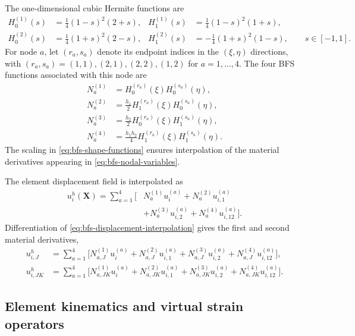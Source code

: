 \documentclass[preprint,12pt]{elsarticle}
\begin{document}
The one-dimensional cubic Hermite functions are
\begin{align}
 H_0^{(1)}(s)&=\frac{1}{4}(1-s)^2(2+s),
 & H_1^{(1)}(s)&=\frac{1}{4}(1-s)^2(1+s),
 \nonumber\\
 H_0^{(2)}(s)&=\frac{1}{4}(1+s)^2(2-s),
 & H_1^{(2)}(s)&=-\frac{1}{4}(1+s)^2(1-s),
 \qquad s\in[-1,1].
 \label{eq:hermite-functions}
\end{align}
For node $a$, let $(r_a,s_a)$ denote its endpoint indices in the
$(\xi,\eta)$ directions, with
$(r_a,s_a)=(1,1),(2,1),(2,2),(1,2)$ for $a=1,\ldots,4$. The four BFS
functions associated with this node are
\begin{align}
 N_a^{(1)}&=H_0^{(r_a)}(\xi)H_0^{(s_a)}(\eta),
 \nonumber\\
 N_a^{(2)}&=\frac{h_1}{2}H_1^{(r_a)}(\xi)H_0^{(s_a)}(\eta),
 \nonumber\\
 N_a^{(3)}&=\frac{h_2}{2}H_0^{(r_a)}(\xi)H_1^{(s_a)}(\eta),
 \nonumber\\
 N_a^{(4)}&=\frac{h_1h_2}{4}H_1^{(r_a)}(\xi)H_1^{(s_a)}(\eta).
 \label{eq:bfs-shape-functions}
\end{align}
The scaling in \eqref{eq:bfs-shape-functions} ensures interpolation of
the material derivatives appearing in \eqref{eq:bfs-nodal-variables}.

The element displacement field is interpolated as
\begin{align}
 u_i^h(\mathbf{X})
 =\sum_{a=1}^{4}\bigl[
 &N_a^{(1)}u_i^{(a)}
 +N_a^{(2)}u_{i,1}^{(a)}
 \nonumber\\
 &+N_a^{(3)}u_{i,2}^{(a)}
 +N_a^{(4)}u_{i,12}^{(a)}
 \bigr].
 \label{eq:bfs-displacement-interpolation}
\end{align}
Differentiation of \eqref{eq:bfs-displacement-interpolation} gives the
first and second material derivatives,
\begin{align}
 u_{i,J}^h
 &=\sum_{a=1}^{4}\bigl[
 N_{a,J}^{(1)}u_i^{(a)}+N_{a,J}^{(2)}u_{i,1}^{(a)}
 +N_{a,J}^{(3)}u_{i,2}^{(a)}+N_{a,J}^{(4)}u_{i,12}^{(a)}
 \bigr],
 \label{eq:bfs-first-derivatives}\\
 u_{i,JK}^h
 &=\sum_{a=1}^{4}\bigl[
 N_{a,JK}^{(1)}u_i^{(a)}+N_{a,JK}^{(2)}u_{i,1}^{(a)}
 +N_{a,JK}^{(3)}u_{i,2}^{(a)}+N_{a,JK}^{(4)}u_{i,12}^{(a)}
 \bigr].
 \label{eq:bfs-second-derivatives}
\end{align}

\subsection{Element kinematics and virtual strain operators}
\label{sec:element-kinematics}
\end{document}
